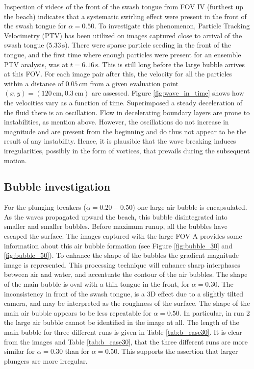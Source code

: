 \documentclass[review, authoryear]{elsarticle}
\newcommand{\s}{\,\mbox{s}}
\newcommand{\cm}{\,\mbox{cm}}
\begin{document}
Inspection of videos of the front of the swash tongue from FOV IV (furthest up the beach) indicates that a systematic swirling effect were present in the front of the swash tongue for $\alpha=0.50$. To investigate this phenomenon, Particle Tracking Velocimetry (PTV) has been utilized on images captured close to arrival of the swash tongue ($5.33\s$). There were sparse particle seeding in the front of the tongue, and the first time where enough particles were present for an ensemble PTV analysis, was at $t=6.16\s$. This is still long before the large bubble arrives at this FOV. For each image pair after this, the velocity for all the particles within a distance of $0.05\cm$ from a given evaluation point $(x,y)=(120\cm,0.3\cm)$ are assessed. Figure \ref{fig:wave_in_time} shows how the velocities vary as a function of time. Superimposed a steady deceleration of the fluid there is an 
oscillation.
Flow in decelerating boundary layers are prone to instabilities, as mention above.
However, the oscillations do not increase in magnitude and are present
from the beginning and do thus not appear to be the result of any instability. 
 Hence, it is plausible that the wave breaking induces irregularities, possibly in the form of vortices, that prevails during the subsequent motion. 


 
 \subsection{Bubble investigation}
 \label{bub_inv}
 For the plunging breakers ($\alpha=0.20-0.50$) one large air bubble is encapsulated. As the waves propagated upward the beach, this bubble disintegrated into smaller and smaller bubbles. Before maximum runup, all the 
bubbles have escaped the surface. The images captured with the large FOV A provides some information about this air bubble formation (see Figure \ref{fig:bubble_30} and \ref{fig:bubble_50}). To enhance the shape of the bubbles the gradient magnitude image is represented. This processing technique will enhance sharp interphases between air and water, and accentuate the contour of the air bubbles. The shape of the main bubble is oval with a thin tongue in the front, for $\alpha=0.30$. The inconsistency in front of the swash tongue, is a 3D effect due to a slightly tilted camera, and may be interpreted as the roughness of the surface. The shape of the main air bubble appears to be less repeatable for $\alpha=0.50$. In particular, in run 2 the large air bubble cannot
 be identified in the image at all. The length of the main bubble for three different runs is given in Table \ref{tab:b_case30}. It is clear from the images and Table \ref{tab:b_case30}, that the three different runs are more similar for $\alpha=0.30$ than for $\alpha=0.50$. This supports the assertion that larger plungers are more irregular.
 
\end{document}
